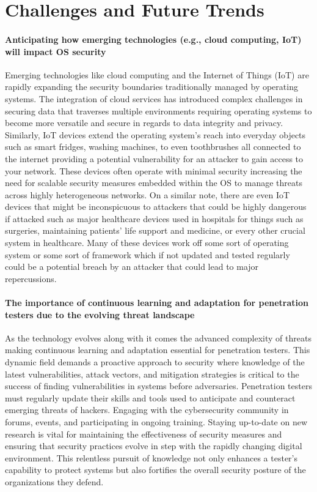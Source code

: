 \documentclass[manuscript,acmsmall,anonymous,review,screen,nonacm=true, authorversion=true]{acmart}
\begin{document}
\section{Challenges and Future Trends}
\paragraph{Anticipating how emerging technologies (e.g., cloud computing, IoT) will impact OS security}
Emerging technologies like cloud computing and the Internet of Things (IoT) are rapidly expanding the security boundaries traditionally managed by operating systems. The integration of cloud services has introduced complex challenges in securing data that traverses multiple environments requiring operating systems to become more versatile and secure in regards to data integrity and privacy. Similarly, IoT devices extend the operating system's reach into everyday objects such as smart fridges, washing machines, to even toothbrushes all connected to the internet providing a potential vulnerability for an attacker to gain access to your network. These devices often operate with minimal security increasing the need for scalable security measures embedded within the OS to manage threats across highly heterogeneous networks. On a similar note, there are even IoT devices that might be inconspicuous to attackers that could be highly dangerous if attacked such as major healthcare devices used in hospitals for things such as surgeries, maintaining patients' life support and medicine, or every other crucial system in healthcare. Many of these devices work off some sort of operating system or some sort of framework which if not updated and tested regularly could be a potential breach by an attacker that could lead to major repercussions.

\paragraph{The importance of continuous learning and adaptation for penetration testers due to the evolving threat landscape}
As the technology evolves along with it comes the advanced complexity of threats making continuous learning and adaptation essential for penetration testers. This dynamic field demands a proactive approach to security where knowledge of the latest vulnerabilities, attack vectors, and mitigation strategies is critical to the success of finding vulnerabilities in systems before adversaries. Penetration testers must regularly update their skills and tools used to anticipate and counteract emerging threats of hackers. Engaging with the cybersecurity community in forums, events, and participating in ongoing training. Staying up-to-date on new research is vital for maintaining the effectiveness of security measures and ensuring that security practices evolve in step with the rapidly changing digital environment. This relentless pursuit of knowledge not only enhances a tester’s capability to protect systems but also fortifies the overall security posture of the organizations they defend.
\end{document}
